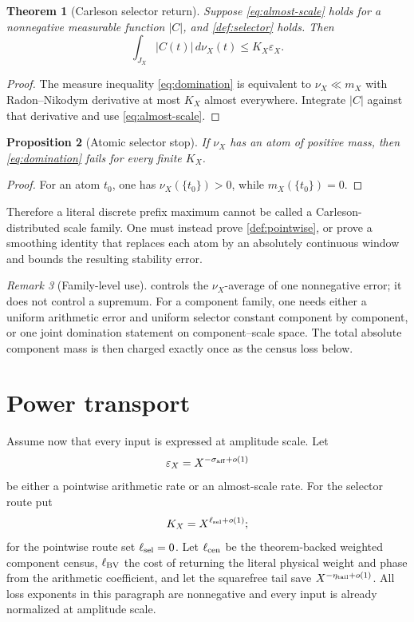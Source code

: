 \documentclass[11pt]{article}
\newtheorem{theorem}{Theorem}[section]
\newtheorem{proposition}[theorem]{Proposition}
\theoremstyle{definition}
\theoremstyle{remark}
\newtheorem{remark}[theorem]{Remark}
\begin{document}
\begin{theorem}[Carleson selector return]
\label{thm:selector}
Suppose \eqref{eq:almost-scale} holds for a nonnegative measurable
function \(|C|\), and \cref{def:selector} holds.  Then
\begin{equation}
\boxed{
 \int_{J_X}|C(t)|\,d\nu_X(t)
 \le K_X\varepsilon_X.}
\label{eq:return}
\end{equation}
\end{theorem}

\begin{proof}
The measure inequality \eqref{eq:domination} is equivalent to
\(\nu_X\ll m_X\) with Radon--Nikodym derivative at most \(K_X\)
almost everywhere.  Integrate \(|C|\) against that derivative and
use \eqref{eq:almost-scale}.
\end{proof}

\begin{proposition}[Atomic selector stop]
\label{prop:atomic}
If \(\nu_X\) has an atom of positive mass, then
\eqref{eq:domination} fails for every finite \(K_X\).
\end{proposition}

\begin{proof}
For an atom \(t_0\), one has
\(\nu_X(\{t_0\})>0\), while
\(m_X(\{t_0\})=0\).
\end{proof}

Therefore a literal discrete prefix maximum cannot be called a
Carleson-distributed scale family.  One must instead prove
\cref{def:pointwise}, or prove a smoothing identity that replaces
each atom by an absolutely continuous window and bounds the
resulting stability error.

\begin{remark}[Family-level use]
\label{rem:family-selector}
 controls the \(\nu_X\)-average of one
nonnegative error; it does not control a supremum.  For a component
family, one needs either a uniform arithmetic error and uniform
selector constant component by component, or one joint domination
statement on component--scale space.  The total absolute component
mass is then charged exactly once as the census loss below.
\end{remark}

\section{Power transport}

Assume now that every input is expressed at amplitude scale.  Let
\[
 \varepsilon_X=X^{-\sigma_{\rm aff}+o(1)}
\]
be either a pointwise arithmetic rate or an almost-scale rate.
For the selector route put
\[
 K_X=X^{\ell_{\rm sel}+o(1)};
\]
for the pointwise route set \(\ell_{\rm sel}=0\).  Let
\(\ell_{\rm cen}\) be the theorem-backed weighted component census,
\(\ell_{\rm BV}\) the cost of returning the literal physical weight
and phase from the arithmetic coefficient, and let the squarefree
tail save \(X^{-\eta_{\rm tail}+o(1)}\).
All loss exponents in this paragraph are nonnegative and every
input is already normalized at amplitude scale.
\end{document}

